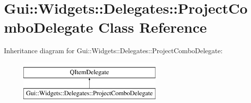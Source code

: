 \hypertarget{classGui_1_1Widgets_1_1Delegates_1_1ProjectComboDelegate}{\section{Gui\-:\-:Widgets\-:\-:Delegates\-:\-:Project\-Combo\-Delegate Class Reference}
\label{classGui_1_1Widgets_1_1Delegates_1_1ProjectComboDelegate}
}
Inheritance diagram for Gui\-:\-:Widgets\-:\-:Delegates\-:\-:Project\-Combo\-Delegate\-:\begin{figure}[H]
\begin{center}
\leavevmode
\includegraphics[height=2.000000cm]{d6/d93/classGui_1_1Widgets_1_1Delegates_1_1ProjectComboDelegate}
\end{center}
\end{figure}
